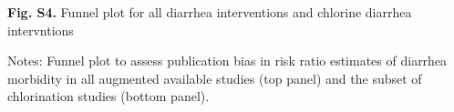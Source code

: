 \documentclass[12pt]{article}
\begin{document}
\newpage
\noindent\textbf{Fig. S4.} Funnel plot for all diarrhea interventions and chlorine diarrhea intervntions
\begin{figure}[H]
    \centering
\end{figure}

{\noindent\fontsize{10}{10}\selectfont Notes: Funnel plot to assess publication bias in risk ratio estimates of diarrhea morbidity in all augmented available studies (top panel) and the subset of chlorination studies (bottom panel).}
\end{document}
